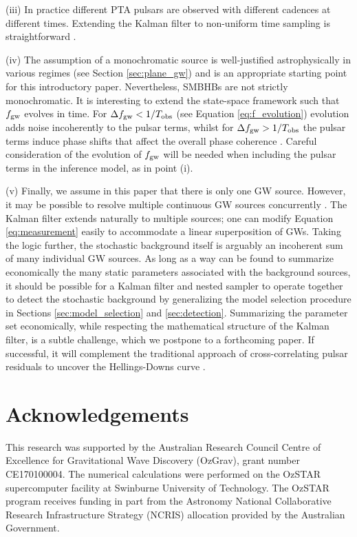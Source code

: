 \documentclass[fleqn,usenatbib,useAMS]{mnras}
\begin{document}
(iii) In practice different PTA pulsars are observed with different cadences at different times. Extending the Kalman filter to non-uniform time sampling is straightforward \citep{zarchan2000fundamentals}. \newline 



(iv) The assumption of a monochromatic source is well-justified astrophysically in various regimes (see Section \ref{sec:plane_gw}) and is an appropriate starting point for this introductory paper. Nevertheless, SMBHBs are not strictly monochromatic. It is interesting to extend the state-space framework such that $f_{\rm gw}$ evolves in time. For $\Delta f_{\rm gw} < 1 / T_{\rm obs}$ (see Equation \eqref{eq:f_evolution}) evolution adds noise incoherently to the pulsar terms, whilst for $\Delta f_{\rm gw} > 1 / T_{\rm obs}$ the pulsar terms induce phase shifts that affect the overall phase coherence \citep{Sesana2010,Perrodin2018}. Careful consideration of the evolution of $f_{\rm gw}$ will be needed when including the pulsar terms in the inference model, as in point (i). \newline 


(v) Finally, we assume in this paper that there is only one GW source. However, it may be possible to resolve multiple continuous GW sources concurrently \citep{PhysRevD.85.044034}. The Kalman filter extends naturally to multiple sources; one can modify Equation \eqref{eq:measurement} easily to accommodate a linear superposition of GWs. Taking the logic further, the stochastic background itself is arguably an incoherent sum of many individual GW sources. As long as a way can be found to summarize economically the many static parameters associated with the background sources, it should be possible for a Kalman filter and nested sampler to operate together to detect the stochastic background by generalizing the model selection procedure in Sections \ref{sec:model_selection} and \ref{sec:detection}. Summarizing the parameter set economically, while respecting the mathematical structure of the Kalman filter, is a subtle challenge, which we postpone to a forthcoming paper. If successful, it will complement the traditional approach of cross-correlating pulsar residuals to uncover the Hellings-Downs curve \citep{Hellings,2023ApJ...951L...8A}. \newline 



\section*{Acknowledgements}
This research was supported by the Australian Research Council Centre of Excellence for Gravitational Wave Discovery (OzGrav), grant number CE170100004. The numerical calculations were performed on the OzSTAR supercomputer facility at Swinburne University of Technology. The OzSTAR program receives funding in part from the Astronomy National Collaborative Research Infrastructure Strategy (NCRIS) allocation provided by the Australian Government.
\end{document}
